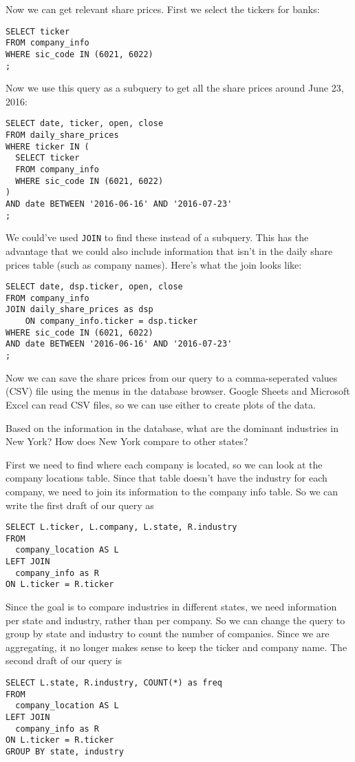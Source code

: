 \documentclass[10pt]{exam}
\begin{document}
\begin{questions}
\begin{solution}
Now we can get relevant share prices. First we select the tickers for banks:
\begin{lstlisting}
SELECT ticker
FROM company_info
WHERE sic_code IN (6021, 6022)
;
\end{lstlisting}
Now we use this query as a subquery to get all the share prices around June 23,
2016:
\begin{lstlisting}
SELECT date, ticker, open, close
FROM daily_share_prices
WHERE ticker IN (
  SELECT ticker
  FROM company_info
  WHERE sic_code IN (6021, 6022)
)
AND date BETWEEN '2016-06-16' AND '2016-07-23'
;
\end{lstlisting}
We could've used \texttt{JOIN} to find these instead of a subquery. This
has the advantage that we could also include
information that isn't in the daily share prices table (such as company names).
Here's what the join looks like:
\begin{lstlisting}
SELECT date, dsp.ticker, open, close
FROM company_info
JOIN daily_share_prices as dsp
    ON company_info.ticker = dsp.ticker
WHERE sic_code IN (6021, 6022)
AND date BETWEEN '2016-06-16' AND '2016-07-23'
;
\end{lstlisting}

Now we can save the share prices from our query to a comma-seperated values
(CSV) file using the menus in the database browser. Google Sheets and Microsoft
Excel can read CSV files, so we can use either to create plots of the data.
\end{solution}


\question Based on the information in the database, what are the dominant
industries in New York? How does New York compare to other states?

\begin{solution}
First we need to find where each company is located, so we can look at the
company locations table. Since that table doesn't have the industry for each
company, we need to join its information to the company info table. So we can
write the first draft of our query as
\begin{lstlisting}
SELECT L.ticker, L.company, L.state, R.industry
FROM
  company_location AS L
LEFT JOIN
  company_info as R
ON L.ticker = R.ticker
\end{lstlisting}

Since the goal is to compare industries in different states, we need
information per state and industry, rather than per company. So we can change
the query to group by state and industry to count the number of companies.
Since we are aggregating, it no longer makes sense to keep the ticker and
company name. The second draft of our query is
\begin{lstlisting}
SELECT L.state, R.industry, COUNT(*) as freq
FROM
  company_location AS L
LEFT JOIN
  company_info as R
ON L.ticker = R.ticker
GROUP BY state, industry
\end{lstlisting}


\end{solution}
\end{questions}
\end{document}
